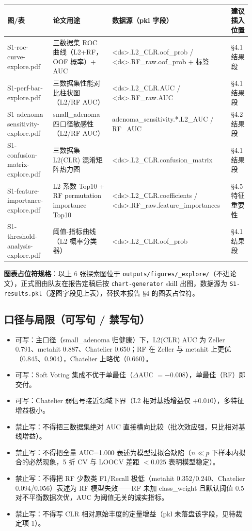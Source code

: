 \documentclass{article}
\begin{document}
\begin{center}
\scriptsize
\begin{tabular}{p{4.2cm} p{4.6cm} p{4.6cm} p{2.2cm}}
\toprule
图/表 & 论文用途 & 数据源（pkl 字段） & 建议插入位置 \\
\midrule
S1-roc-curve-explore.pdf & 三数据集 ROC 曲线（L2+RF，OOF 概率）+ AUC & <ds>.L2\_CLR.oof\_prob / <ds>.RF\_raw.oof\_prob + 标签 & §4.1 结果段 \\
S1-perf-bar-explore.pdf & 三数据集性能对比柱状图（L2/RF AUC） & <ds>.L2\_CLR.AUC / <ds>.RF\_raw.AUC & §4.1 结果段 \\
S1-adenoma-sensitivity-explore.pdf & small\_adenoma 四口径敏感性（L2/RF AUC） & adenoma\_sensitivity.*.L2\_AUC / RF\_AUC & §4.2 结果段 \\
S1-confusion-matrix-explore.pdf & 三数据集 L2(CLR) 混淆矩阵热力图 & <ds>.L2\_CLR.confusion\_matrix & §4.1 结果段 \\
S1-feature-importance-explore.pdf & L2 系数 Top10 + RF permutation importance Top10 & <ds>.L2\_CLR.coefficients / <ds>.RF\_raw.feature\_importances & §4.5 特征重要性 \\
S1-threshold-analysis-explore.pdf & 阈值-指标曲线（L2 概率分类器） & <ds>.L2\_CLR.oof\_prob & §4.1 结果段 \\
\bottomrule
\end{tabular}
\end{center}

\textbf{图表占位符规格}：以上 6 张探索图位于 \texttt{outputs/figures/\_explore/}（不进论文），正式图由队友在报告定稿后按 \texttt{chart-generator} skill 出图，数据源为 \texttt{S1-results.pkl}（逐图字段见上表），替换本报告 §4 的图表占位符。

\subsection{口径与局限（可写句 / 禁写句）}

\begin{itemize}
  \item 可写：主口径（small\_adenoma 归健康）下，L2(CLR) AUC 为 Zeller 0.791、metahit 0.887、Chatelier 0.650；RF 在 Zeller 与 metahit 上更优（0.845、0.904），Chatelier 上略优（0.660）。
  \item 可写：Soft Voting 集成不优于单最佳（$\Delta$AUC $=-0.008$），单最佳（RF）即交付。
  \item 可写：Chatelier 弱信号接近领域下界（L2 相对基线增益仅 $+0.010$），多特征增益极小。
  \item 禁止写：不得把三数据集绝对 AUC 直接横向比较（批次效应强，只比相对基线增益）。
  \item 禁止写：不得把全量 AUC=1.000 表述为模型过拟合缺陷（$n\ll p$ 下样本内拟合的必然现象，5 折 CV 与 LOOCV 差距 $<0.025$ 表明模型稳定）。
  \item 禁止写：不得把 RF 少数类 F1/Recall 极低（metahit 0.352/0.240、Chatelier 0.094/0.056）表述为 RF 模型失效——RF 未加 class\_weight 且默认阈值 0.5 对不平衡数据次优，AUC 为阈值无关的诚实指标。
  \item 禁止写：不得写 CLR 相对原始丰度的定量增益（pkl 未落盘该字段，见待裁定项 1）。
\end{itemize}
\end{document}
